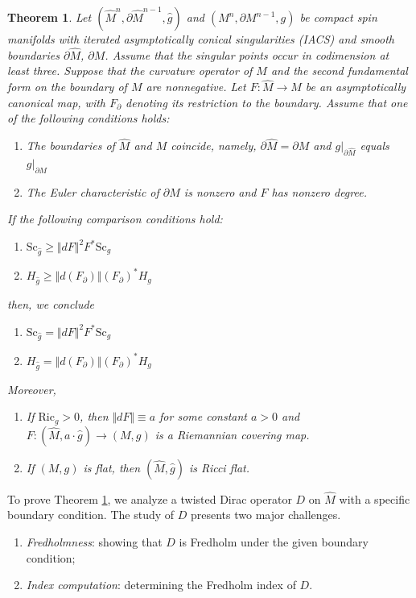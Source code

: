 \documentclass[12pt, reqno]{amsart}
\theoremstyle{plain} %
\newtheorem{theorem}{Theorem}[section]
\theoremstyle{definition}
\theoremstyle{remark}
\numberwithin{equation}{section}
\newcommand{\dom}[1]{\hat{#1}}
\newcommand{\onorm}[1]{\Vert #1 \Vert}
\newcommand{\bnd}[1]{\partial #1}
\newcommand{\Sc}{\mathrm{Sc}}
\newcommand{\Ric}{\mathrm{Ric}}
\newcommand{\tdim}{n} %
\begin{document}
\begin{theorem}\label{thm:intro-scalar curvature comparison}
	Let \((\dom{M}^{\tdim},\bnd{\dom{M}}^{\tdim-1},\dom{g})\) and \((M^{\tdim},\bnd{M}^{\tdim-1},g)\) be compact spin manifolds with iterated asymptotically conical singularities (IACS) and smooth boundaries \(\bnd{\dom{M}}\), \(\bnd{M}\).
    Assume that the singular points occur in codimension at least three.
	Suppose that the curvature operator of \(M\) and the second fundamental form on the boundary of \(M\) are nonnegative.
	Let \(F \colon \dom{M} \to M\) be an asymptotically canonical map, with \(F_\partial\) denoting its restriction to the boundary.
    Assume that one of the following conditions holds:
	\begin{enumerate}[label=\((\roman*)\)]
		\item The boundaries of \(\dom{M}\) and \(M\) coincide, namely, \(\bnd{\dom{M}} = \bnd{M}\) and \(g|_{\bnd{\dom{M}}}\) equals \(g|_{\bnd{M}}\)
		\item The Euler characteristic of \(\bnd{M}\) is nonzero and \(F\) has nonzero degree.
	\end{enumerate}
	If the following comparison conditions hold:
	\begin{enumerate}[label=\textnormal{(\arabic*)}]
		\item \(\Sc_{\dom{g}} \geq \onorm{dF}^2 F^*\Sc_g\)
		\item \(H_{\dom{g}} \geq \onorm{d(F_\partial)} (F_\partial)^*H_g\)
	\end{enumerate}
	then, we conclude
	\begin{enumerate}[label=\textup{(\Roman*)}]
		\item \(\Sc_{\dom{g}} = \onorm{dF}^2 F^* \Sc_g\)
		\item \(H_{\dom{g}} = \onorm{d(F_\partial)} (F_\partial)^*H_g\)
	\end{enumerate}
	Moreover,
	\begin{enumerate}[label=\((\mathrm{\Roman*}^\prime)\)]
		\item If \(\Ric_g > 0\), then \(\onorm{dF} \equiv a\) for some constant \(a > 0\) and \(F \colon (\dom{M}, a \cdot \dom{g}) \to (M,g)\) is a Riemannian covering map.
		\item If \((M, g)\) is flat, then \((\dom{M}, \dom{g})\) is Ricci flat.
	\end{enumerate}
\end{theorem}

To prove Theorem \ref{thm:intro-scalar curvature comparison}, we analyze a twisted Dirac operator \(D\) on \(\dom{M}\) with a specific boundary condition.
The study of \(D\) presents two major challenges.
\begin{enumerate}[label=(\alph*)]
	\item \emph{Fredholmness}: showing that \(D\) is Fredholm under the given boundary condition;
	\item \emph{Index computation}: determining the Fredholm index of \(D\).
\end{enumerate}
\end{document}
